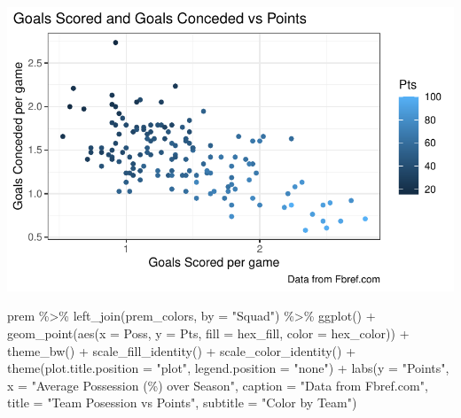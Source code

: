 \documentclass[
  letterpaper,
  DIV=11,
  numbers=noendperiod]{scrartcl}
\newenvironment{Shaded}{\begin{snugshade}}{\end{snugshade}}
\newcommand{\AttributeTok}[1]{\textcolor[rgb]{0.40,0.45,0.13}{#1}}
\newcommand{\FunctionTok}[1]{\textcolor[rgb]{0.28,0.35,0.67}{#1}}
\newcommand{\NormalTok}[1]{\textcolor[rgb]{0.00,0.23,0.31}{#1}}
\newcommand{\SpecialCharTok}[1]{\textcolor[rgb]{0.37,0.37,0.37}{#1}}
\newcommand{\StringTok}[1]{\textcolor[rgb]{0.13,0.47,0.30}{#1}}
\begin{document}
\includegraphics{project_part_3_files/figure-pdf/goals-and-points-plot-1.pdf}

\begin{Shaded}
\begin{Highlighting}[]
\NormalTok{prem }\SpecialCharTok{\%\textgreater{}\%}
  \FunctionTok{left\_join}\NormalTok{(prem\_colors, }\AttributeTok{by =} \StringTok{"Squad"}\NormalTok{) }\SpecialCharTok{\%\textgreater{}\%}
  \FunctionTok{ggplot}\NormalTok{() }\SpecialCharTok{+}
  \FunctionTok{geom\_point}\NormalTok{(}\FunctionTok{aes}\NormalTok{(}\AttributeTok{x =}\NormalTok{ Poss, }\AttributeTok{y =}\NormalTok{ Pts, }\AttributeTok{fill =}\NormalTok{ hex\_fill, }\AttributeTok{color =}\NormalTok{ hex\_color)) }\SpecialCharTok{+}
  \FunctionTok{theme\_bw}\NormalTok{() }\SpecialCharTok{+}
  \FunctionTok{scale\_fill\_identity}\NormalTok{() }\SpecialCharTok{+}
  \FunctionTok{scale\_color\_identity}\NormalTok{() }\SpecialCharTok{+}
  \FunctionTok{theme}\NormalTok{(}\AttributeTok{plot.title.position =} \StringTok{"plot"}\NormalTok{,}
        \AttributeTok{legend.position =} \StringTok{"none"}\NormalTok{) }\SpecialCharTok{+}
  \FunctionTok{labs}\NormalTok{(}\AttributeTok{y =} \StringTok{"Points"}\NormalTok{,}
       \AttributeTok{x =} \StringTok{"Average Possession (\%) over Season"}\NormalTok{,}
       \AttributeTok{caption =} \StringTok{"Data from Fbref.com"}\NormalTok{,}
       \AttributeTok{title =} \StringTok{"Team Posession vs Points"}\NormalTok{,}
       \AttributeTok{subtitle =} \StringTok{"Color by Team"}\NormalTok{)}
\end{Highlighting}
\end{Shaded}
\end{document}

